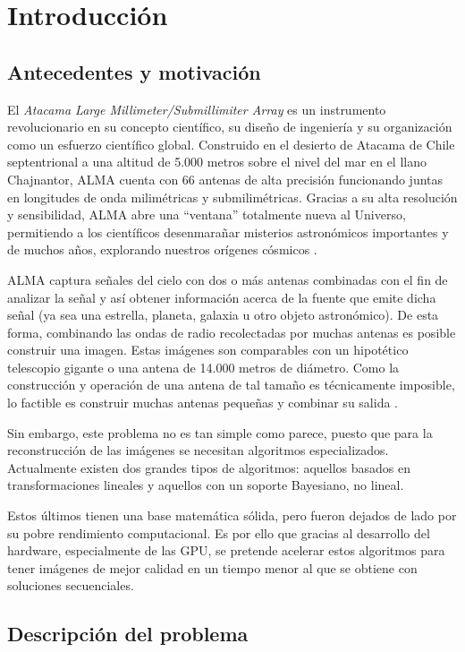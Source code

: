 \chapter{Introducci\'on}
\label{cap:introduccion}

\section{Antecedentes y motivaci\'on}
\label{intro:motivacion}
El \textit{Atacama Large Millimeter/Submillimiter Array} es un instrumento revolucionario en su concepto científico, su diseño de ingeniería y su organización como un esfuerzo científico global. Construido en el desierto de Atacama de Chile septentrional a una altitud de 5.000 metros sobre el nivel del mar en el llano Chajnantor, ALMA cuenta con 66 antenas de alta precisión funcionando juntas en longitudes de onda milimétricas y submilimétricas. Gracias a su alta resolución y sensibilidad, ALMA abre una “ventana” totalmente nueva al Universo, permitiendo a los científicos desenmarañar misterios astronómicos importantes y de muchos años, explorando nuestros orígenes cósmicos \citep{alma}.

ALMA captura señales del cielo con dos o más antenas combinadas con el fin de analizar  la señal y así obtener información acerca de la fuente que emite dicha señal (ya sea una estrella, planeta, galaxia u otro objeto astronómico). De esta forma, combinando las ondas de radio recolectadas por muchas antenas es posible construir una imagen. Estas imágenes son comparables con un hipotético telescopio gigante o una antena de 14.000 metros de diámetro. Como la construcción y operación de una antena de tal tamaño es técnicamente imposible, lo factible es construir muchas antenas pequeñas y combinar su salida \citep{howalma}.

Sin embargo, este problema no es tan simple como parece, puesto que para la reconstrucción de las imágenes se necesitan algoritmos especializados. Actualmente existen dos grandes tipos de algoritmos: aquellos basados en transformaciones lineales y aquellos con un soporte Bayesiano, no lineal.

Estos últimos tienen una base matemática sólida, pero fueron dejados de lado por su pobre rendimiento computacional. Es por ello que gracias al desarrollo del hardware, especialmente de las GPU, se pretende acelerar estos algoritmos para tener imágenes de mejor calidad en un tiempo menor al que se obtiene con soluciones secuenciales.

\section{Descripci\'on del problema}
\label{intro:problema}

